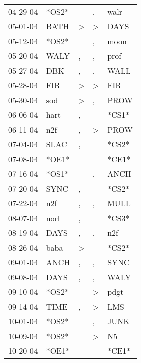 \begin{supertabular}{lllll}
 04-29-04 &  *OS2* &                  &                , &   walr \\
 05-01-04 &   BATH &     \textgreater &     \textgreater &   DAYS \\
 05-12-04 &  *OS2* &                  &                , &   moon \\
 05-20-04 &   WALY &                , &                , &   prof \\
 05-27-04 &    DBK &                , &                , &   WALL \\
 05-28-04 &    FIR &     \textgreater &     \textgreater &    FIR \\
 05-30-04 &    sod &     \textgreater &                , &   PROW \\
 06-06-04 &   hart &                , &                  &  *CS1* \\
 06-11-04 &    n2f &                , &     \textgreater &   PROW \\
 07-04-04 &   SLAC &                , &                  &  *CS2* \\
 07-08-04 &  *OE1* &                  &                  &  *CE1* \\
 07-16-04 &  *OS1* &                  &                , &   ANCH \\
 07-20-04 &   SYNC &                , &                  &  *CS2* \\
 07-22-04 &    n2f &                , &                , &   MULL \\
 08-07-04 &   norl &                , &                  &  *CS3* \\
 08-19-04 &   DAYS &                , &                , &    n2f \\
 08-26-04 &   baba &     \textgreater &                  &  *CS2* \\
 09-01-04 &   ANCH &                , &                , &   SYNC \\
 09-08-04 &   DAYS &                , &                , &   WALY \\
 09-10-04 &  *OS2* &                  &     \textgreater &   pdgt \\
 09-14-04 &   TIME &                , &     \textgreater &    LMS \\
 10-01-04 &  *OS2* &                  &                , &   JUNK \\
 10-09-04 &  *OS2* &                  &     \textgreater &     N5 \\
 10-20-04 &  *OE1* &                  &                  &  *CE1* \\

\end{supertabular}
